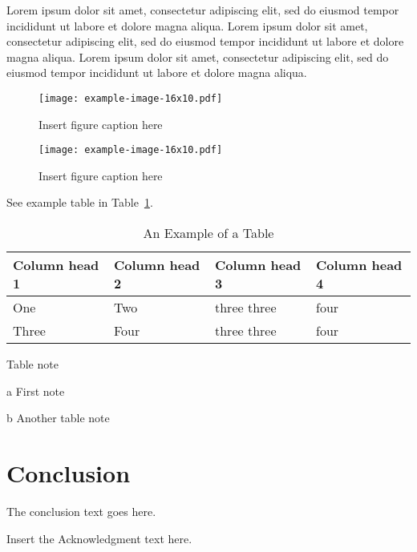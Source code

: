 \documentclass[
  journal=small,
  manuscript=article-type,  %
  year=2020,
  volume=37,
]{cup-journal}
\begin{document}
Lorem ipsum dolor sit amet, consectetur adipiscing elit, sed do eiusmod tempor incididunt ut labore et dolore magna aliqua. Lorem ipsum dolor sit amet, consectetur adipiscing elit, sed do eiusmod tempor incididunt ut labore et dolore magna aliqua. Lorem ipsum dolor sit amet, consectetur adipiscing elit, sed do eiusmod tempor incididunt ut labore et dolore magna aliqua. 



\begin{figure}[hbt!]
\centering
\texttt{[image: example-image-16x10.pdf]}
\caption{Insert figure caption here}
\label{fig_sim}
\end{figure}


\begin{figure*}
\centering
\texttt{[image: example-image-16x10.pdf]}
\caption{Insert figure caption here}
\label{fig_wide}
\end{figure*}


See example table in Table~\ref{table_example}.

\begin{table}[hbt!]
\begin{threeparttable}
\caption{An Example of a Table}
\label{table_example}
\begin{tabular}{llll}
\toprule
\headrow Column head 1 & Column head 2  & Column head 3 & Column head 4\\
\midrule
One\tnote{a} & Two&three three &four\\ 
\midrule
Three & Four&three three\tnote{b} &four\\
\bottomrule
\end{tabular}
\begin{tablenotes}[hang]
\item[]Table note
\item[a]First note
\item[b]Another table note
\end{tablenotes}
\end{threeparttable}
\end{table}


\section{Conclusion}
The conclusion text goes here.


\begin{acknowledgement}
Insert the Acknowledgment text here.
\end{acknowledgement}

\printendnotes

\printbibliography
\end{document}
